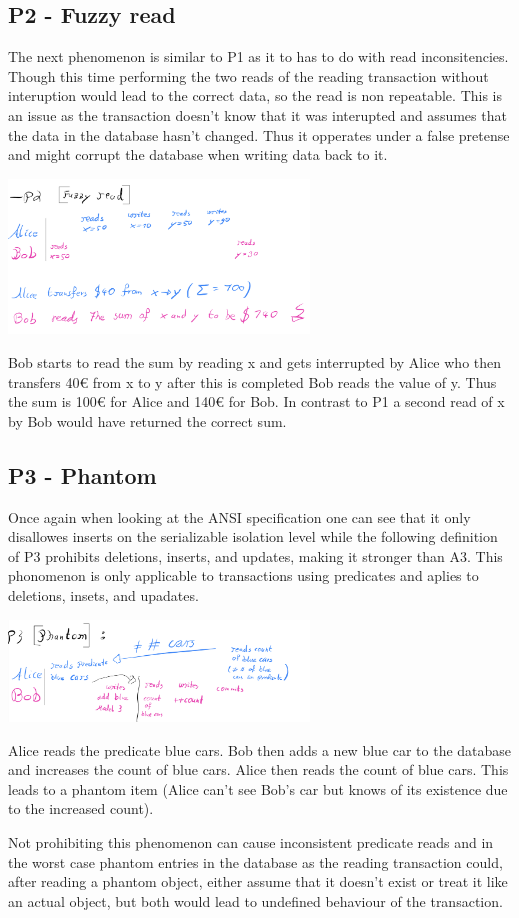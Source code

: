\documentclass[sigconf, review=true]{acmart}
\begin{document}
\subsection{P2 - Fuzzy read}
The next phenomenon is similar to P1 as it to has to do with read inconsitencies.
Though this time performing the two reads of the reading transaction without interuption would lead
to the correct data, so the read is non repeatable. This is an issue as the transaction doesn't know that
it was interupted and assumes that the data in the database hasn't changed. Thus it opperates under a false pretense
and might corrupt the database when writing data back to it.

\includegraphics[width=8cm]{P2}
\begin{example}
    Bob starts to read the sum by reading x and gets interrupted by Alice who then transfers 40€ from x to y after this is completed Bob reads the value of y.
    Thus the sum is 100€ for Alice and 140€ for Bob.
    In contrast to P1 a second read of x by Bob would have returned the correct sum.
\end{example}
\subsection{P3 - Phantom}
Once again when looking at the ANSI specification one can see that it only disallowes inserts on the serializable
isolation level while the following definition of P3 prohibits deletions, inserts, and updates, making it stronger than A3.
This phonomenon is only applicable to transactions using predicates and aplies to deletions, insets, and upadates.


\includegraphics[width=8cm]{P3}
\begin{example}
    Alice reads the predicate blue cars. Bob then adds a new blue car to the database and increases
    the count of blue cars. Alice then reads the count of blue cars. This leads to a phantom item
    (Alice can’t see Bob's car but knows of its existence due to the increased count).
\end{example}
Not prohibiting this phenomenon can cause inconsistent predicate reads and in the worst case phantom entries in the
database as the reading transaction could, after reading a phantom object, either assume that it doesn't exist or treat it like an actual
object, but both would lead to undefined behaviour of the transaction.
\end{document}
